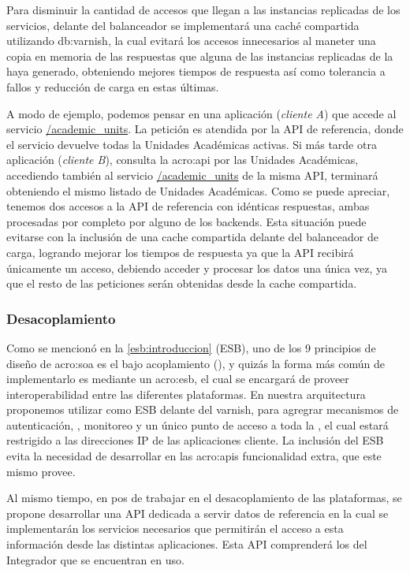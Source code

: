 Para disminuir la cantidad de accesos que llegan a las instancias replicadas de los servicios, delante del balanceador se implementará una caché compartida utilizando \gls{db:varnish}, la cual evitará los accesos innecesarios al maneter una copia en memoria de las respuestas que alguna de las instancias replicadas de la {\cloud} haya generado, obteniendo mejores tiempos de respuesta así como tolerancia a fallos y reducción de carga en estas últimas.

A modo de ejemplo, podemos pensar en una aplicación (\textit{cliente A}) que accede al servicio \url{/academic_units}. La petición es atendida por la API de referencia, donde el servicio devuelve todas la Unidades Académicas activas. Si más tarde otra aplicación (\textit{cliente B}), consulta la \gls{acro:api} por las Unidades Académicas, accediendo también al servicio \url{/academic_units} de la misma API, terminará obteniendo el mismo listado de Unidades Académicas. Como se puede apreciar, tenemos dos accesos a la API de referencia con idénticas respuestas, ambas procesadas por completo por alguno de los backends. Esta situación puede evitarse con la inclusión de una cache compartida delante del balanceador de carga, logrando mejorar los tiempos de respuesta ya que la API recibirá únicamente un acceso, debiendo acceder y procesar los datos una única vez, ya que el resto de las peticiones serán obtenidas desde la cache compartida.


\subsubsection{Desacoplamiento}

Como se mencionó en la \autoref{esb:introduccion} (ESB), uno de los 9 principios de diseño de \gls{acro:soa} es el bajo acoplamiento (), y quizás la forma más común de implementarlo es mediante un \gls{acro:esb}, el cual se encargará de proveer interoperabilidad entre las diferentes plataformas.  En nuestra arquitectura proponemos utilizar  como ESB delante del varnish, para agregrar mecanismos de autenticación, , monitoreo y un único punto de acceso a toda la {\cloud}, el cual estará restrigido a las direcciones IP de las aplicaciones cliente. La inclusión del ESB evita la necesidad de desarrollar en las \glspl{acro:api} funcionalidad extra, que este mismo provee.

Al mismo tiempo, en pos de trabajar en el desacoplamiento de las plataformas, se propone desarrollar una API dedicada a servir datos de referencia en la cual se implementarán los servicios necesarios que permitirán el acceso a esta información desde las distintas aplicaciones.  Esta API comprenderá los  del Integrador que se encuentran en uso.

